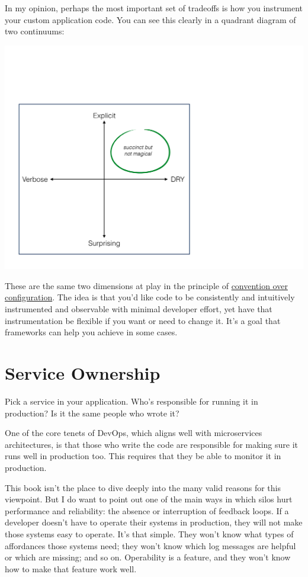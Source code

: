 \documentclass{vivid_layout}
\begin{document}
In my opinion, perhaps the most important set of tradeoffs is how you instrument
your custom application code. You can see this clearly in a quadrant diagram of two
continuums:
\begin{center}
\includegraphics[width=.85\linewidth]{architecture-monitoring/coc}
\end{center}

These are the same two dimensions at play in the principle of
\href{https://en.wikipedia.org/wiki/Convention\_over\_configuration}{convention
over configuration}. The idea is that you'd like code to be consistently and
intuitively instrumented and observable with minimal developer effort, yet have
that instrumentation be flexible if you want or need to change it.
It's a goal that frameworks can help you achieve in some cases.

\section{Service Ownership}

Pick a service in your application. Who's responsible for running it in
production? Is it the same people who wrote it?

One of the core tenets of DevOps, which aligns well with microservices
architectures, is that those who write the code are responsible for making sure
it runs well in production too. This requires that they be
able to monitor it in production.

This book isn't the place to dive deeply into the many valid reasons for this
viewpoint. But I do want to point out one of the main ways in which
silos hurt performance and reliability: the absence or interruption of feedback
loops. If a developer doesn't have to operate their systems in production, they
will not make those systems easy to operate. It's that simple. They won't know
what types of affordances those systems need; they won't know which log messages
are helpful or which are missing; and so on. Operability is a feature, and they
won't know how to make that feature work well.
\end{document}
